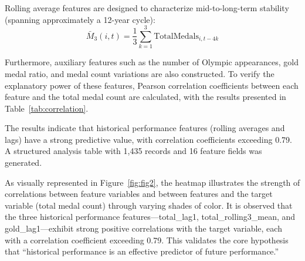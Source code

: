 \documentclass{mcmthesis}
\begin{document}
Rolling average features are designed to characterize mid-to-long-term stability (spanning approximately a 12-year cycle):
\begin{equation}
\bar{M}_3(i,t) = \frac{1}{3}\sum_{k=1}^{3} \text{TotalMedals}_{i,t-4k}
\end{equation}

Furthermore, auxiliary features such as the number of Olympic appearances, gold medal ratio, and medal count variations are also constructed. To verify the explanatory power of these features, Pearson correlation coefficients between each feature and the total medal count are calculated, with the results presented in Table~\ref{tab:correlation}.


\begin{table}[H]
\centering
\caption{Correlation Analysis between Features and Total Medals}
\label{tab:correlation}
\end{table}

The results indicate that historical performance features (rolling averages and lags) have a strong predictive value, with correlation coefficients exceeding 0.79. A structured analysis table with 1,435 records and 16 feature fields was generated.

As visually represented in Figure~\ref{fig:fig2}, the heatmap illustrates the strength of correlations between feature variables and between features and the target variable (total medal count) through varying shades of color. It is observed that the three historical performance features—total\_lag1, total\_rolling3\_mean, and gold\_lag1—exhibit strong positive correlations with the target variable, each with a correlation coefficient exceeding 0.79. This validates the core hypothesis that “historical performance is an effective predictor of future performance.”
\end{document}
